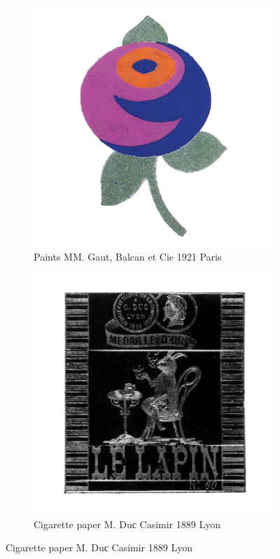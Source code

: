 \begin{figure}[h]
  \begin{subfigure}{.45\textwidth}
    \centering
    \includegraphics[width=.5\linewidth]{images/supplement/trademarks/french/9_21}
    \caption[]{Paints MM. Gaut, Balcan et Cie 1921 Paris}
    \label{fig:trademarks:french:9.21}
  \end{subfigure}\hfill
  \begin{subfigure}{.45\textwidth}
    \centering
    \includegraphics[width=.5\linewidth]{images/supplement/trademarks/french/10_5}
    \caption[]{Cigarette paper M. Duс Casimir 1889 Lyon}
    \label{fig:trademarks:french:10.5}
  \end{subfigure}


\end{figure}
